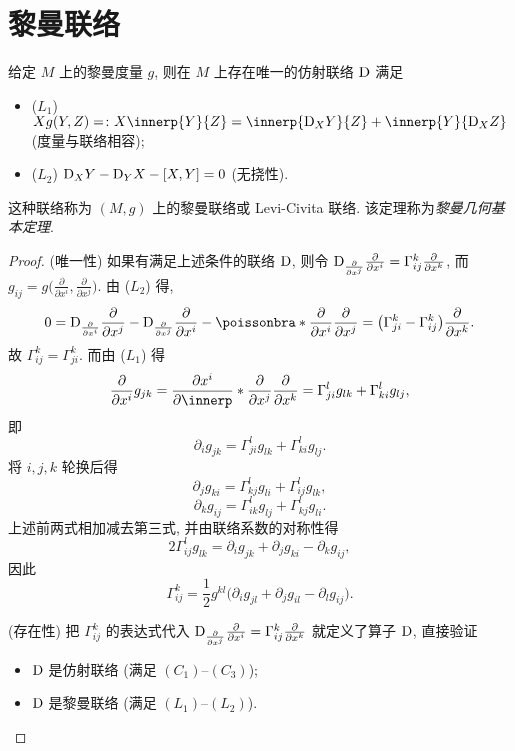\section{黎曼联络}



\begin{theorem}
  给定 $M$ 上的黎曼度量 $g$, 则在 $M$ 上存在唯一的仿射联络 $\mathrm{D}$ 满足
  \begin{itemize}
    \item ($L_1$) $Xg(Y,Z)=\colon X\innerp{Y}{Z}=\innerp{\D_X Y}{Z}+\innerp{Y}{\D_X Z}$ (度量与联络相容);
    \item ($L_2$) $\mathrm{D}_XY - \mathrm{D}_YX - [X,Y] = 0$ (无挠性).
  \end{itemize}
  这种联络称为 $(M,g)$ 上的黎曼联络或 Levi-Civita 联络.
  该定理称为\emph{黎曼几何基本定理}.
\end{theorem}

\begin{proof}
  (唯一性) 如果有满足上述条件的联络 $\mathrm{D}$, 则令
  $\mathrm{D}_{\frac{\partial}{\partial x^j}}\frac{\partial}{\partial x^i} = \Gamma_{ij}^k\frac{\partial}{\partial x^k}$,
  而 $g_{ij} = g\bigl(\frac{\partial}{\partial x^i}, \frac{\partial}{\partial x^j}\bigr)$.
  由 ($L_2$) 得,
  \[0 = \D_{\pdv{x^i}}\pdv{x^j} - \D_{\pdv{x^j}}\pdv{x^i} - \poissonbra*{\pdv{x^i}}{\pdv{x^j}}
    = \bigl(\Gamma_{ji}^k-\Gamma_{ij}^k\bigr)\pdv{x^k}.\]
  故 $\Gamma_{ij}^k = \Gamma_{ji}^k$. 而由 ($L_1$) 得
  \[\pdv{x^i}g_{jk} = \pdv{x^i}\innerp*{\pdv{x^j}}{\pdv{x^k}} 
    = \Gamma_{ji}^l g_{lk} + \Gamma_{ki}^l g_{lj},\]
  即
  \[\partial_i g_{jk} = \Gamma_{ji}^l g_{lk} + \Gamma_{ki}^l g_{lj}.\]
  将 $i,j,k$ 轮换后得
  \[\partial_j g_{ki} = \Gamma_{kj}^l g_{li} + \Gamma_{ij}^l g_{lk},\]
  \[\partial_k g_{ij} = \Gamma_{ik}^l g_{lj} + \Gamma_{kj}^l g_{li}.\]
  上述前两式相加减去第三式, 并由联络系数的对称性得
  \[2\Gamma_{ij}^l g_{lk} = \partial_i g_{jk} + \partial_j g_{ki} - \partial_k g_{ij},\]
  因此
  \[\Gamma_{ij}^k = \frac{1}{2}g^{kl} \bigl(\partial_i g_{jl} + \partial_j g_{il} - \partial_l g_{ij}\bigr).\]

  (存在性) 把 $\Gamma_{ij}^k$ 的表达式代入 $\mathrm{D}_{\pdv{x^j}}\pdv{x^i} = \Gamma_{ij}^k\pdv{x^k}$
  就定义了算子 $\mathrm{D}$, 直接验证
  \begin{itemize}
    \item $\mathrm{D}$ 是仿射联络 (满足 $(C_1)$--$(C_3)$);
    \item $\mathrm{D}$ 是黎曼联络 (满足 $(L_1)$--$(L_2)$).\qedhere
  \end{itemize}
\end{proof}


